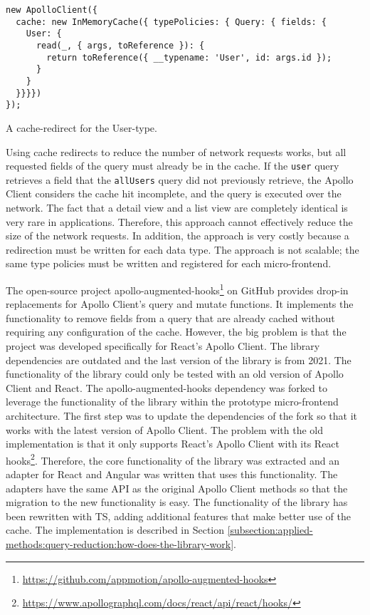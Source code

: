 \ifshowListings
\begin{listing}[H]
  \begin{verbatim}
new ApolloClient({
  cache: new InMemoryCache({ typePolicies: { Query: { fields: {
    User: {
      read(_, { args, toReference }): {
        return toReference({ __typename: 'User', id: args.id });
      }
    }
  }}}})
});
  \end{verbatim}
\caption{A cache-redirect for the User-type.}\label{code:applied-methods:query-reduction:user-cache-redirect}
\end{listing}
\fi

\noindent Using cache redirects to reduce the number of network requests works, but all requested fields of the query must already be in the cache. If the \texttt{user} query retrieves a field that the \texttt{allUsers} query did not previously retrieve, the Apollo Client considers the cache hit incomplete, and the query is executed over the network. The fact that a detail view and a list view are completely identical is very rare in applications. Therefore, this approach cannot effectively reduce the size of the network requests. In addition, the approach is very costly because a redirection must be written for each data type. The approach is not scalable; the same type policies must be written and registered for each micro-frontend.

\bigskip

\noindent The open-source project apollo-augmented-hooks\footnote{\url{https://github.com/appmotion/apollo-augmented-hooks}} on GitHub provides drop-in replacements for Apollo Client's query and mutate functions. It implements the functionality to remove fields from a query that are already cached without requiring any configuration of the cache. However, the big problem is that the project was developed specifically for React's Apollo Client. The library dependencies are outdated and the last version of the library is from 2021. The functionality of the library could only be tested with an old version of Apollo Client and React. The apollo-augmented-hooks dependency was forked to leverage the functionality of the library within the prototype micro-frontend architecture. The first step was to update the dependencies of the fork so that it works with the latest version of Apollo Client. The problem with the old implementation is that it only supports React's Apollo Client with its React hooks\footnote{\url{https://www.apollographql.com/docs/react/api/react/hooks/}}. Therefore, the core functionality of the library was extracted and an adapter for React and Angular was written that uses this functionality. The adapters have the same \ac{API} as the original Apollo Client methods so that the migration to the new functionality is easy. The functionality of the library has been rewritten with \ac{TS}, adding additional features that make better use of the cache. The implementation is described in Section \ref{subsection:applied-methods:query-reduction:how-does-the-library-work}.

\ifshowAppliedMethodsTestingQueryReduction
  
\fi




